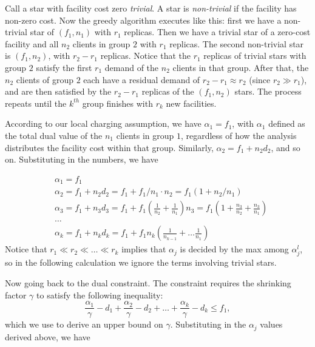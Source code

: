 \documentclass[oneside,final]{ucr}
\def\dsp{\def\baselinestretch{2.0}\large\normalsize}
\def\ssp{\def\baselinestretch{1.0}\large\normalsize}
\begin{document}
Call a star with facility cost zero \emph{trivial}. A star
is \emph{non-trivial} if the facility has non-zero cost. Now
the greedy algorithm executes like this: first we have a
non-trivial star of $(f_1, n_1)$ with $r_1$ replicas. Then
we have a trivial star of a zero-cost facility and all $n_2$
clients in group $2$ with $r_1$ replicas. The second
non-trivial star is $(f_1, n_2)$, with $r_2 - r_1$
replicas. Notice that the $r_1$ replicas of trivial stars
with group $2$ satisfy the first $r_1$ demand of the $n_2$
clients in that group. After that, the $n_2$ clients of
group $2$ each have a residual demand of $r_2 - r_1 \approx
r_2$ (since $r_2 \gg r_1$), and are then satisfied by the
$r_2 - r_1$ replicas of the $(f_1, n_2)$ stars. The process
repeats until the $k^{th}$ group finishes with $r_k$ new
facilities.

According to our local charging assumption, we have
$\alpha_1 = f_1$, with $\alpha_1$ defined as the total dual
value of the $n_1$ clients in group $1$, regardless of how
the analysis distributes the facility cost within that
group. Similarly, $\alpha_2 = f_1 + n_2 d_2$, and so
on. Substituting in the numbers, we have

\ssp
\begin{align*}
  &\alpha_1 = f_1\\
  &\alpha_2 = f_1 + n_2 d_2 = f_1 + f_1/n_1\cdot n_2 = f_1 (1 + n_2 /
  n_1)\\
  &\alpha_3 = f_1 + n_3 d_3 = f_1 + f_1 (\frac{1}{n_2} +
  \frac{1}{n_1}) n_3 = f_1 (1 + \frac{n_3}{n_2} + \frac{n_3}{n_1})\\
  &\ldots\\
  &\alpha_k = f_1 + n_k d_k = f_1 + f_1 n_k (\frac{1}{n_{k-1}} + \ldots
  \frac{1}{n_1})
\end{align*}
\dsp
Notice that $r_1 \ll r_2 \ll \ldots \ll r_k$ implies that
$\alpha_j$ is decided by the max among $\alpha_j^l$, so in
the following calculation we ignore the terms involving
trivial stars.

Now going back to the dual constraint. The constraint
requires the shrinking factor $\gamma$ to satisfy the
following inequality:
\begin{equation}
  \frac{\alpha_1}{\gamma} - d_1 + \frac{\alpha_2}{\gamma} - d_2 +
  \ldots + \frac{\alpha_k}{\gamma} - d_k \leq f_1,
\end{equation}
which we use to derive an upper bound on $\gamma$.
Substituting in the $\alpha_j$ values derived above, we have
\end{document}
